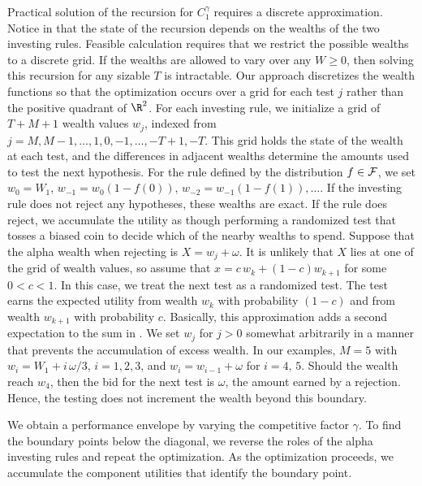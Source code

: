 \documentclass[12pt]{article}
\begin{document}
 Practical solution of the recursion for $C_1^\gamma$ requires a discrete
 approximation.  Notice in  that the state of the recursion depends
 on the wealths of the two investing rules. Feasible calculation requires that
 we restrict the possible wealths to a discrete grid.  If the wealths are
 allowed to vary over any $W \ge 0$, then solving this recursion for any sizable
 $T$ is intractable.  Our approach discretizes the wealth functions so that the
 optimization occurs over a grid for each test $j$ rather than the positive
 quadrant of $\R^2$.  For each investing rule, we initialize a grid of $T+M+1$
 wealth values $w_j$, indexed from $j=M, M-1, \ldots, 1, 0, -1, \ldots, -T+1,
 -T$.  This grid holds the state of the wealth at each test, and the differences
 in adjacent wealths determine the amounts used to test the next hypothesis.
  For the rule defined by the distribution $f \in {\cal F}$, we set $w_0 = W_1$,
 $w_{-1} = w_0(1-f(0))$, $w_{-2} = w_{-1}(1-f(1)), \ldots$.  If the investing
 rule does not reject any hypotheses, these wealths are exact.  If the rule does
 reject, we accumulate the utility as though performing a randomized test that
 tosses a biased coin to decide which of the nearby wealths to spend.  Suppose
 that the alpha wealth when rejecting is $X = w_j + \omega$.  It is unlikely
 that $X$ lies at one of the grid of wealth values, so assume that $x = c \, w_k
 + (1-c) w_{k+1}$ for some $0 < c < 1$.  In this case, we treat the next test as
 a randomized test.  The test earns the expected utility from wealth $w_k$ with
 probability $(1-c)$ and from wealth $w_{k+1}$ with probability $c$. Basically,
 this approximation adds a second expectation to the sum in . We
 set $w_j$ for $j > 0$ somewhat arbitrarily in a manner that prevents the
 accumulation of excess wealth.  In our examples, $M=5$ with $w_i = W_1 + i
 \,\omega/3$, $i=1,2,3$, and $w_i = w_{i-1} + \omega$ for $i=4,\,5$.  Should the
 wealth reach $w_4$, then the bid for the next test is $\omega$, the amount
 earned by a rejection.  Hence, the testing does not increment the wealth beyond
 this boundary.
 

 We obtain a performance envelope by varying the competitive factor $\gamma$.
  To find the boundary points below the diagonal, we reverse the roles of the
 alpha investing rules and repeat the optimization.  As the optimization
 proceeds, we accumulate the component utilities that identify the boundary
 point.


\end{document}
